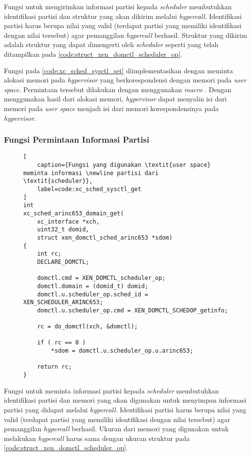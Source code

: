 Fungsi untuk mengirimkan informasi partisi kepada \textit{scheduler} membutuhkan identifikasi
partisi dan struktur yang akan dikirim melalui \textit{hypercall}. Identifikasi partisi harus
berupa nilai yang valid (terdapat partisi yang memiliki identifikasi dengan nilai tersebut) agar
pemanggilan \textit{hypercall} berhasil. Struktur yang dikirim adalah struktur yang dapat
dimengerti oleh \textit{scheduler} seperti yang telah ditampilkan pada
\autoref{code:struct_xen_domctl_scheduler_op}.

Fungsi pada \autoref{code:xc_sched_sysctl_set} diimplementasikan dengan meminta alokasi memori
pada \textit{hypervisor} yang berkorespondensi dengan memori pada \textit{user space}.
Permintaan tersebut dilakukan dengan menggunakan \textit{macro} . Dengan
menggunakan hasil dari alokasi memori, \textit{hypervisor} dapat menyalin isi dari memori pada
\textit{user space} menjadi isi dari memori korespondensinya pada \textit{hypervisor}.

\subsubsection{Fungsi Permintaan Informasi Partisi}
\label{section:fungsi_permintaan_informasi_partisi}

\begin{figure}[!ht]
\begin{lstlisting}[
	caption={Fungsi yang digunakan \textit{user space} meminta informasi \newline partisi dari \textit{scheduler}},
	label=code:xc_sched_sysctl_get
]
int
xc_sched_arinc653_domain_get(
    xc_interface *xch,
    uint32_t domid,
    struct xen_domctl_sched_arinc653 *sdom)
{
    int rc;
    DECLARE_DOMCTL;

    domctl.cmd = XEN_DOMCTL_scheduler_op;
    domctl.domain = (domid_t) domid;
    domctl.u.scheduler_op.sched_id = XEN_SCHEDULER_ARINC653;
    domctl.u.scheduler_op.cmd = XEN_DOMCTL_SCHEDOP_getinfo;

    rc = do_domctl(xch, &domctl);

    if ( rc == 0 )
        *sdom = domctl.u.scheduler_op.u.arinc653;

    return rc;
}
\end{lstlisting}
\end{figure}

Fungsi untuk meminta informasi partisi kepada \textit{scheduler} membutuhkan identifikasi
partisi dan memori yang akan digunakan untuk menyimpan informasi partisi yang didapat melalui
\textit{hypercall}. Identifikasi partisi harus berupa nilai yang valid (terdapat partisi yang
memiliki identifikasi dengan nilai tersebut) agar pemanggilan \textit{hypercall} berhasil.
Ukuran dari memori yang digunakan untuk melakukan \textit{hypercall} harus sama dengan ukuran
struktur pada \autoref{code:struct_xen_domctl_scheduler_op}.

